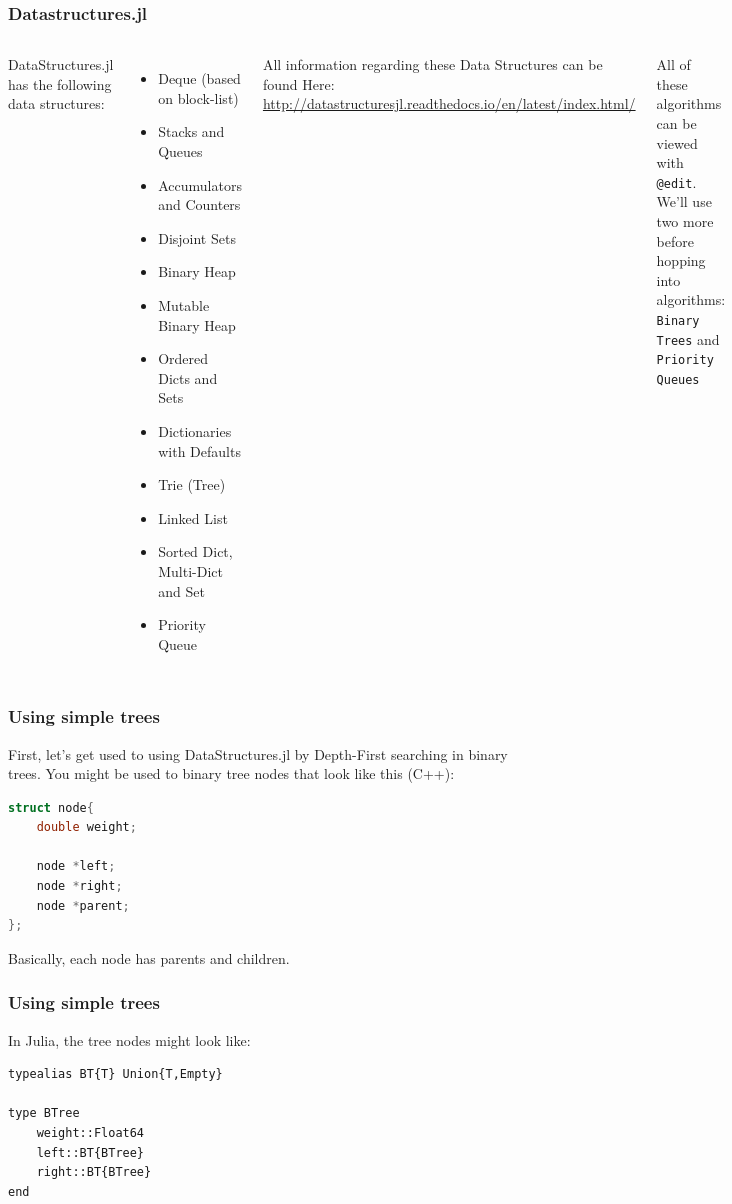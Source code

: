 \documentclass{beamer}
\begin{document}
\begin{frame}
\frametitle{Datastructures.jl}

\begin{columns}
DataStructures.jl has the following data structures:
\begin{itemize}
\item Deque (based on block-list)
\item Stacks and Queues
\item Accumulators and Counters
\item Disjoint Sets
\item Binary Heap
\item Mutable Binary Heap
\item Ordered Dicts and Sets
\item Dictionaries with Defaults
\item Trie (Tree)
\item Linked List
\item Sorted Dict, Multi-Dict and Set
\item Priority Queue
\end{itemize}
\pause
{}
All information regarding these Data Structures can be found Here: \url{ http://datastructuresjl.readthedocs.io/en/latest/index.html/}

\vspace{0.5cm}
All of these algorithms can be viewed with \texttt{@edit}. We'll use two more before hopping into algorithms: \texttt{Binary Trees} and \texttt{Priority Queues}
\end{columns}

\end{frame}


\begin{frame}[fragile]
\frametitle{Using simple trees}
First, let's get used to using DataStructures.jl by Depth-First searching in binary trees. You might be used to binary 	tree nodes that look like this (C++):
\begin{lstlisting}[language=c++]
struct node{
    double weight;

    node *left;
    node *right;
    node *parent;
};
\end{lstlisting}

Basically, each node has parents and children.
\end{frame}

\begin{frame}[fragile]
\frametitle{Using simple trees}
In Julia, the tree nodes might look like:
\begin{lstlisting}
typealias BT{T} Union{T,Empty}

type BTree
    weight::Float64
    left::BT{BTree}
    right::BT{BTree}
end

\end{lstlisting}
\end{frame}
\end{document}
